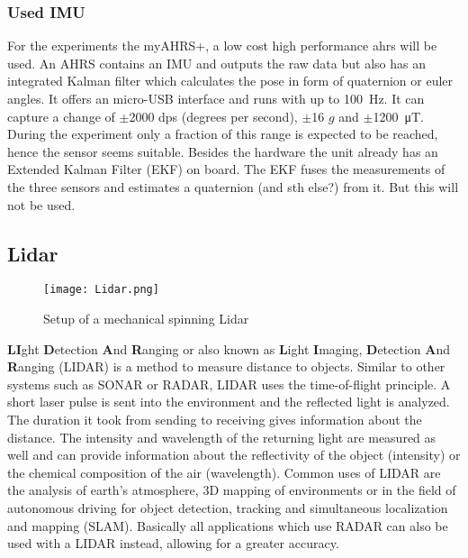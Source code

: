 \subsubsection{Used IMU}
For the experiments the myAHRS+, a low cost high performance \gls{ahrs} will be used.
An AHRS contains an IMU and outputs the raw data but also has an integrated Kalman filter which calculates the pose in form of quaternion or euler angles.
It offers an micro-USB interface and runs with up to \SI{100}{\Hz}.
It can capture a change of $\pm$2000 dps (degrees per second), $\pm$16 $g$ and $\pm$\SI{1200}{\micro\tesla}.
During the experiment only a fraction of this range is expected to be reached, hence the sensor seems suitable.
Besides the hardware the unit already has an Extended Kalman Filter (EKF) on board.
The EKF fuses the measurements of the three sensors and estimates a quaternion (and sth else?) from it.
But this will not be used.

\subsection{Lidar}
\begin{figure}[htb]
	\centering
	\texttt{[image: Lidar.png]}
	\caption{Setup of a mechanical spinning Lidar \cite{Li2020}}
	\label{fig:lidar}
\end{figure}
\textbf{LI}ght \textbf{D}etection \textbf{A}nd \textbf{R}anging or also known as \textbf{L}ight \textbf{I}maging, \textbf{D}etection \textbf{A}nd \textbf{R}anging (LIDAR) is a method to measure distance to objects.
Similar to other systems such as SONAR or RADAR, LIDAR uses the time-of-flight principle.
A short laser pulse is sent into the environment and the reflected light is analyzed.
The duration it took from sending to receiving gives information about the distance.
The intensity and wavelength of the returning light are measured as well and can provide information about the reflectivity of the object (intensity) or the chemical composition of the air (wavelength).
Common uses of LIDAR are the analysis of earth's atmosphere, 3D mapping of environments or in the field of autonomous driving for object detection, tracking and simultaneous localization and mapping (SLAM).
Basically all applications which use RADAR can also be used with a LIDAR instead, allowing for a greater accuracy.

